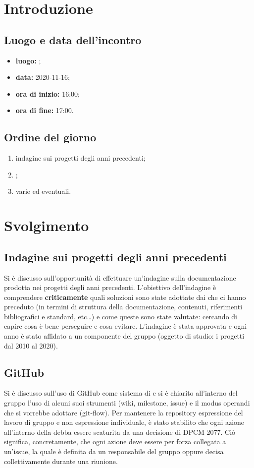 \section*{Introduzione}
\subsection*{Luogo e data dell'incontro}
\begin{itemize}
	\item \textbf{luogo:} ;
	\item \textbf{data:} 2020-11-16;
	\item \textbf{ora di inizio:} 16:00;
	\item \textbf{ora di fine:} 17:00.
\end{itemize}

\subsection*{Ordine del giorno}
\begin{enumerate}
	\item indagine sui progetti degli anni precedenti;
	\item {};
	\item varie ed eventuali.
\end{enumerate}

\section*{Svolgimento}
\subsection*{Indagine sui progetti degli anni precedenti}
Si è discusso sull'opportunità di effettuare un'indagine sulla documentazione prodotta nei progetti degli anni precedenti. L'obiettivo dell'indagine è comprendere \textbf{criticamente} quali soluzioni sono state adottate dai  che ci hanno preceduto (in termini di struttura della documentazione, contenuti, riferimenti bibliografici e standard, etc\dots) e come queste sono state valutate: cercando di capire cosa è bene perseguire e cosa evitare. L'indagine è stata approvata e ogni anno è stato affidato a un componente del gruppo (oggetto di studio: i progetti dal 2010 al 2020).

\subsection*{GitHub}
Si è discusso sull'uso di GitHub come sistema di 
e si è chiarito all'interno del gruppo l'uso di alcuni suoi strumenti (wiki, milestone, issue) e il modus operandi che si vorrebbe adottare (git-flow). Per mantenere la repository espressione del lavoro di gruppo e non espressione individuale, è stato stabilito che ogni azione all'interno della  debba essere scaturita da una decisione di DPCM 2077. Ciò significa, concretamente, che ogni azione deve essere per forza collegata a un'issue, la quale è definita da un responsabile del gruppo oppure decisa collettivamente durante una riunione. 
